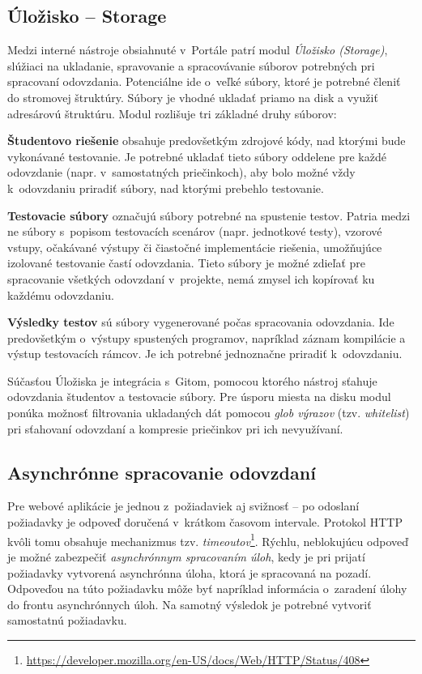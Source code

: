 \documentclass[
  digital, %
  oneside, %
  table,   %
  lof,     %
  lot,   %
]{fithesis3}
\newcommand*{\footurl}[1]{\footnote{\url{#1}}}
\begin{document}
\subsection{Úložisko -- Storage}

Medzi interné nástroje obsiahnuté v~Portále patrí modul \emph{Úložisko (Storage)}, slúžiaci na ukladanie, spravovanie a spracovávanie súborov potrebných pri spracovaní odovzdania. Potenciálne ide o~veľké súbory, ktoré je potrebné členiť do stromovej štruktúry. Súbory je vhodné ukladať priamo na disk a využiť adresárovú štruktúru. Modul rozlišuje tri základné druhy súborov: 

\textbf{Študentovo riešenie} obsahuje predovšetkým zdrojové kódy, nad ktorými bude vykonávané testovanie. Je potrebné ukladať tieto súbory oddelene pre každé odovzdanie (napr. v~samostatných priečinkoch), aby bolo možné vždy k~odovzdaniu priradiť súbory, nad ktorými prebehlo testovanie.

\textbf{Testovacie súbory} označujú súbory potrebné na spustenie testov. Patria medzi ne súbory s~popisom testovacích scenárov (napr. jednotkové testy), vzorové vstupy, očakávané výstupy či čiastočné implementácie riešenia, umožňujúce izolované testovanie častí odovzdania. Tieto súbory je možné zdieľať pre spracovanie všetkých odovzdaní v~projekte, nemá zmysel ich kopírovať ku každému odovzdaniu.

\textbf{Výsledky testov} sú súbory vygenerované počas spracovania odovzdania. Ide predovšetkým o~výstupy spustených programov, napríklad záznam kompilácie a výstup testovacích rámcov. Je ich potrebné jednoznačne priradiť k~odovzdaniu.

Súčasťou Úložiska je integrácia s~Gitom, pomocou ktorého nástroj sťahuje odovzdania študentov a testovacie súbory. Pre úsporu miesta na disku modul ponúka možnosť filtrovania ukladaných dát pomocou \emph{glob výrazov} (tzv. \emph{whitelist}) pri sťahovaní odovzdaní a kompresie priečinkov pri ich nevyužívaní.

\subsection{Asynchrónne spracovanie odovzdaní}
\label{design-async-process}

Pre webové aplikácie je jednou z~požiadaviek aj svižnosť -- po odoslaní požiadavky je odpoveď doručená v~krátkom časovom intervale. Protokol HTTP kvôli tomu obsahuje mechanizmus tzv. \emph{timeoutov}\footurl{https://developer.mozilla.org/en-US/docs/Web/HTTP/Status/408}. Rýchlu, neblokujúcu odpoveď je možné zabezpečiť \emph{asynchrónnym spracovaním úloh}, kedy je pri prijatí požiadavky vytvorená asynchrónna úloha, ktorá je spracovaná na pozadí. Odpoveďou na túto požiadavku môže byť napríklad informácia o~zaradení úlohy do frontu asynchrónnych úloh. Na samotný výsledok je potrebné vytvoriť samostatnú požiadavku.
\end{document}
